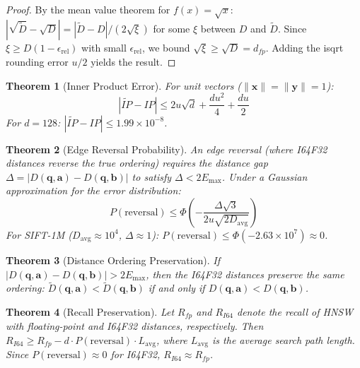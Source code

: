 \documentclass[10pt,journal]{IEEEtran}
\newtheorem{theorem}{Theorem}
\newcommand{\hnsw}{\textsc{HNSW}}
\begin{document}
\begin{proof}
By the mean value theorem for $f(x) = \sqrt{x}$: $|\sqrt{\tilde{D}} - \sqrt{D}| = |\tilde{D} - D| / (2\sqrt{\xi})$ for some $\xi$ between $D$ and $\tilde{D}$. Since $\xi \geq D(1 - \epsilon_{\text{rel}})$ with small $\epsilon_{\text{rel}}$, we bound $\sqrt{\xi} \geq \sqrt{D} = d_{fp}$. Adding the isqrt rounding error $u/2$ yields the result.
\end{proof}

\begin{theorem}[Inner Product Error]
\label{thm:ip_error}
For unit vectors ($\|\mathbf{x}\| = \|\mathbf{y}\| = 1$):
\begin{equation}
  |\widetilde{IP} - IP| \leq 2u\sqrt{d} + \frac{du^2}{4} + \frac{du}{2}
\end{equation}
For $d = 128$: $|\widetilde{IP} - IP| \leq 1.99 \times 10^{-8}$.
\end{theorem}

\begin{theorem}[Edge Reversal Probability]
\label{thm:edge_reversal}
An edge reversal (where I64F32 distances reverse the true ordering) requires the distance gap $\Delta = |D(\mathbf{q}, \mathbf{a}) - D(\mathbf{q}, \mathbf{b})|$ to satisfy $\Delta < 2E_{\max}$. Under a Gaussian approximation for the error distribution:
\begin{equation}
  P(\text{reversal}) \leq \Phi\!\left(-\frac{\Delta\sqrt{3}}{2u\sqrt{2D_{\text{avg}}}}\right)
\end{equation}
For SIFT-1M ($D_{\text{avg}} \approx 10^4$, $\Delta \approx 1$): $P(\text{reversal}) \leq \Phi(-2.63 \times 10^7) \approx 0$.
\end{theorem}

\begin{theorem}[Distance Ordering Preservation]
\label{thm:order_pres}
If $|D(\mathbf{q}, \mathbf{a}) - D(\mathbf{q}, \mathbf{b})| > 2E_{\max}$, then the I64F32 distances preserve the same ordering: $\tilde{D}(\mathbf{q}, \mathbf{a}) < \tilde{D}(\mathbf{q}, \mathbf{b})$ if and only if $D(\mathbf{q}, \mathbf{a}) < D(\mathbf{q}, \mathbf{b})$.
\end{theorem}

\begin{theorem}[Recall Preservation]
\label{thm:recall_pres}
Let $R_{fp}$ and $R_{I64}$ denote the recall of \hnsw{} with floating-point and I64F32 distances, respectively. Then $R_{I64} \geq R_{fp} - d \cdot P(\text{reversal}) \cdot L_{\text{avg}}$, where $L_{\text{avg}}$ is the average search path length. Since $P(\text{reversal}) \approx 0$ for I64F32, $R_{I64} \approx R_{fp}$.
\end{theorem}
\end{document}
